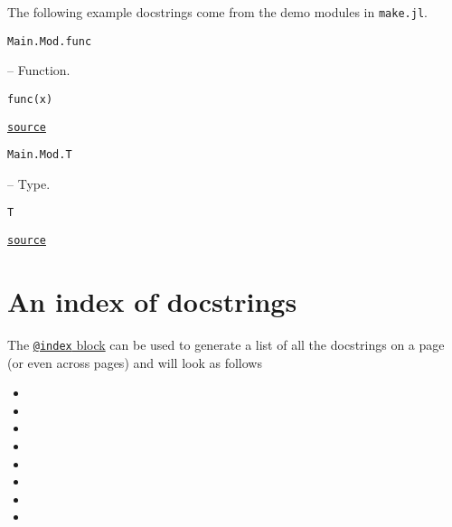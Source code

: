 \label{4859465668994674752}{}


The following example docstrings come from the demo modules in \texttt{make.jl}.


\hypertarget{5669384191785722396}{\texttt{Main.Mod.func}}  -- {Function.}

\begin{adjustwidth}{2em}{0pt}


\begin{verbatim}
func(x)
\end{verbatim}




\href{https://example.org/Repository.jl/blob/test/examples/make.jl#L27-31}{\texttt{source}}


\end{adjustwidth}
\hypertarget{1885743281855441478}{\texttt{Main.Mod.T}}  -- {Type.}

\begin{adjustwidth}{2em}{0pt}


\begin{verbatim}
T
\end{verbatim}




\href{https://example.org/Repository.jl/blob/test/examples/make.jl#L34-38}{\texttt{source}}


\end{adjustwidth}

\section{An index of docstrings}



\label{4901604269105032859}{}


The \href{@ref}{\texttt{@index} block} can be used to generate a list of all the docstrings on a page (or even across pages) and will look as follows


\begin{itemize}
\item {}
\item {}
\item {}
\item {}
\item {}
\item {}
\item {}
\item {}
\end{itemize}


